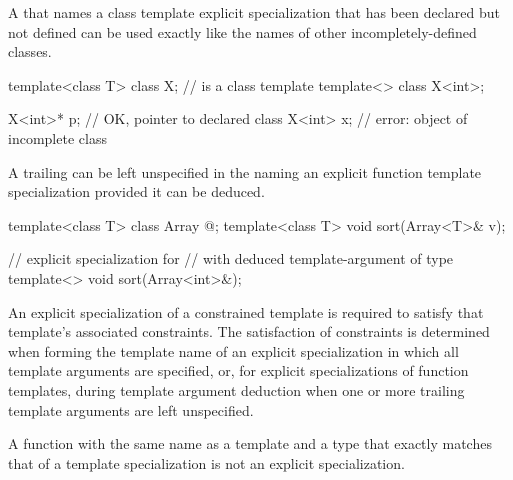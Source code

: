 \pnum
A
that names a class template explicit specialization that has been declared but
not defined can be used exactly like the names of other incompletely-defined
classes.
\begin{example}
\begin{codeblock}
template<class T> class X;                      //  is a class template
template<> class X<int>;

X<int>* p;                                      // OK, pointer to declared class 
X<int> x;                                       // error: object of incomplete class 
\end{codeblock}
\end{example}

\pnum
A trailing
can be left unspecified in the
naming an explicit function template specialization
provided it can be deduced.
\begin{example}
\begin{codeblock}
template<class T> class Array { @\commentellip@ };
template<class T> void sort(Array<T>& v);

// explicit specialization for 
// with deduced template-argument of type 
template<> void sort(Array<int>&);
\end{codeblock}
\end{example}

\pnum
\begin{note}
An explicit specialization of a constrained template is required
to satisfy that template's associated constraints.
The satisfaction of constraints is determined
when forming the template name of an explicit specialization
in which all template arguments are specified,
or, for explicit specializations of function templates,
during template argument deduction
when one or more trailing template arguments are left unspecified.
\end{note}

\pnum
A function with the same name as a template and a type that exactly matches that
of a template specialization is not an explicit specialization.

